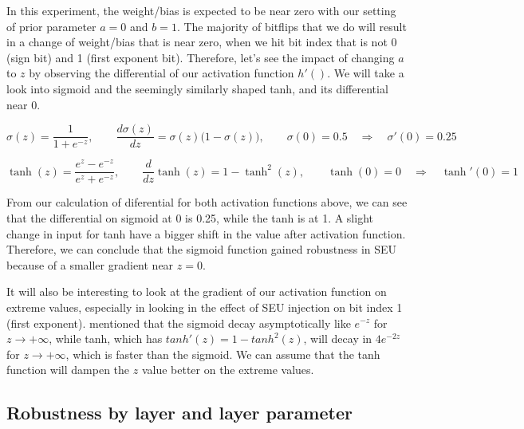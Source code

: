 \documentclass[ %
                    author={Revalda Putawara},
                supervisor={Dr. James Pope},
                    degree={MSc},
                     title={Robustness of Bayesian Neural Networks Design Choices Against Weight and Bias Perturbation Induced by Single Event Upsets (SEUs)},
                      type={},
                      year={2025}]{dissertation}
\begin{document}
In this experiment, the weight/bias is expected to be near zero with our setting of prior parameter $a=0$ and $b=1$. The majority of bitflips that we do will result in a change of weight/bias that is near zero, when we hit bit index that is not 0 (sign bit) and 1 (first exponent bit). Therefore, let's see the impact of changing $a$ to $z$ by observing the differential of our activation function $h'()$. We will take a look into sigmoid and the seemingly similarly shaped tanh, and its differential near 0.

$$
\sigma(z) = \frac{1}{1 + e^{-z}} ,\qquad\frac{d\sigma(z)}{dz} = \sigma(z)\big(1 - \sigma(z)\big) ,\qquad
\sigma(0) = 0.5 \quad \Rightarrow \quad \sigma'(0) = 0.25
$$

$$
\tanh(z) = \frac{e^z - e^{-z}}{e^z + e^{-z}} ,\qquad \frac{d}{dz}\tanh(z) = 1 - \tanh^2(z) ,\qquad
\tanh(0) = 0 \quad \Rightarrow \quad \tanh'(0) = 1
$$

From our calculation of diferential for both activation functions above, we can see that the differential on sigmoid at 0 is 0.25, while the tanh is at 1. A slight change in input for tanh have a bigger shift in the value after activation function. Therefore, we can conclude that the sigmoid function gained robustness in SEU because of a smaller gradient near $z=0$. 

It will also be interesting to look at the gradient of our activation function on extreme values, especially in looking in the effect of SEU injection on bit index 1 (first exponent). \cite{bishoppatternrecognition2007} mentioned that the sigmoid decay asymptotically like $e^{-z}$ for $z \to +\infty$, while tanh, which has $tanh'(z) = 1- tanh^2(z)$, will decay in $4e^{-2z}$ for $z \to +\infty$, which is faster than the sigmoid. We can assume that the tanh function will dampen the $z$ value better on the extreme values.






\subsection{Robustness by layer and layer parameter}
\end{document}
